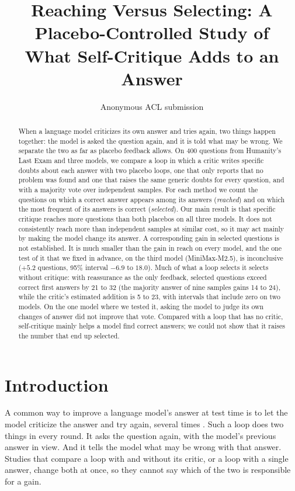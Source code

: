 \documentclass[11pt]{article}
\title{Reaching Versus Selecting: A Placebo-Controlled Study of\\What Self-Critique Adds to an Answer}
\author{Anonymous ACL submission}
\begin{document}
\maketitle

\begin{abstract}
When a language model criticizes its own answer and tries again, two things happen together: the model is asked the question again, and it is told what may be wrong.
We separate the two as far as placebo feedback allows.
On 400 questions from Humanity's Last Exam and three models, we compare a loop in which a critic writes specific doubts about each answer with two placebo loops, one that only reports that no problem was found and one that raises the same generic doubts for every question, and with a majority vote over independent samples.
For each method we count the questions on which a correct answer appears among its answers (\emph{reached}) and on which the most frequent of its answers is correct (\emph{selected}).
Our main result is that specific critique reaches more questions than both placebos on all three models. It does not consistently reach more than independent samples at similar cost, so it may act mainly by making the model change its answer.
A corresponding gain in selected questions is not established.
It is much smaller than the gain in reach on every model, and the one test of it that we fixed in advance, on the third model (MiniMax-M2.5), is inconclusive ($+5.2$ questions, 95\% interval $-6.9$ to $18.0$).
Much of what a loop selects it selects without critique: with reassurance as the only feedback, selected questions exceed correct first answers by 21 to 32 (the majority answer of nine samples gains 14 to 24), while the critic's estimated addition is 5 to 23, with intervals that include zero on two models.
On the one model where we tested it, asking the model to judge its own changes of answer did not improve that vote.
Compared with a loop that has no critic, self-critique mainly helps a model find correct answers; we could not show that it raises the number that end up selected.
\end{abstract}

\section{Introduction}

A common way to improve a language model's answer at test time is to let the model criticize the answer and try again, several times \citep{madaan2023selfrefine,shinn2023reflexion}.
Such a loop does two things in every round.
It asks the question again, with the model's previous answer in view.
And it tells the model what may be wrong with that answer.
Studies that compare a loop with and without its critic, or a loop with a single answer, change both at once, so they cannot say which of the two is responsible for a gain.
\end{document}

